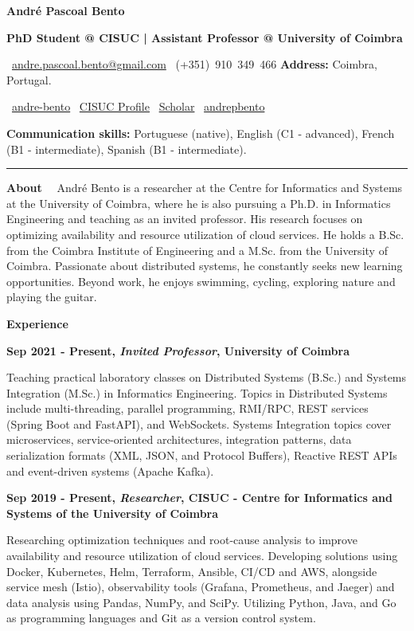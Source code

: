 \documentclass[a4paper,9pt]{memoir}
\newcommand{\cvheading}[1]{{\huge\bfseries\color{RoyalBlue} #1}} %
\newcommand{\cvsubheading}[1]{{\large\bfseries #1} \bigbreak} %
\newcommand{\Sep}{\vspace{1em}} %
\newcommand{\SmallSep}{\vspace{0.5em}} %
\newcommand{\aboutme}[2]{ %
    \textbf{\color{RoyalBlue} #1}~~#2\par\Sep
}
\newcommand{\CVSection}[1]{ %
    {\Large\textbf{#1}}\par
    \SmallSep %
}
\newcommand{\CVItem}[2]{ %
    \textbf{\color{RoyalBlue} #1}\par
    #2
    \SmallSep %
}
\begin{document}
\begin{center}
    \cvheading{\textbf{André Pascoal Bento}}

    \cvsubheading{\Large PhD Student @ CISUC | Assistant Professor @ University of Coimbra}
    
    \faEnvelope~\href{mailto:andre.pascoal.bento@gmail.com}{andre.pascoal.bento@gmail.com} \quad
    \faPhone~(+351)~910~349~466 \quad
    \textbf{Address:} Coimbra, Portugal.

    \faLinkedin~\href{https://www.linkedin.com/in/andre-bento/?locale=en_US}{andre-bento} \quad
    \faGlobe~\href{https://www.cisuc.uc.pt/en/people/apbento}{CISUC Profile} \quad
    \faGoogle~\href{https://scholar.google.com/citations?user=9Yl9gBwAAAAJ&hl=en}{Scholar} \quad
    \faGithub~\href{https://github.com/andrepbento}{andrepbento}

    \textbf{Communication skills:}
    Portuguese (native),
    English (C1 - advanced),
    French (B1 - intermediate),
    Spanish (B1 - intermediate).
    
    \noindent\rule{\linewidth}{0.4pt}
\end{center}


\aboutme{About}{%
André Bento is a researcher at the Centre for Informatics and Systems at the University of Coimbra, where he is also pursuing a Ph.D. in Informatics Engineering and teaching as an invited professor. His research focuses on optimizing availability and resource utilization of cloud services.
%
He holds a B.Sc. from the Coimbra Institute of Engineering and a M.Sc. from the University of Coimbra. Passionate about distributed systems, he constantly seeks new learning opportunities. Beyond work, he enjoys swimming, cycling, exploring nature and playing the guitar.
}

\CVSection{Experience}

\CVItem{Sep 2021 - Present, \textit{Invited Professor}, University of Coimbra}{
    Teaching practical laboratory classes on Distributed Systems (B.Sc.) and Systems Integration (M.Sc.) in Informatics Engineering. Topics in Distributed Systems include multi-threading, parallel programming, RMI/RPC, REST services (Spring Boot and FastAPI), and WebSockets. Systems Integration topics cover microservices, service-oriented architectures, integration patterns, data serialization formats (XML, JSON, and Protocol Buffers), Reactive REST APIs and event-driven systems (Apache Kafka).
}

\CVItem{Sep 2019 - Present, \textit{Researcher}, CISUC - Centre for Informatics and Systems of the University of Coimbra}{
    Researching optimization techniques and root-cause analysis to improve availability and resource utilization of cloud services.
    Developing solutions using Docker, Kubernetes, Helm, Terraform, Ansible, CI/CD and AWS, alongside service mesh (Istio), observability tools (Grafana, Prometheus, and Jaeger) and data analysis using Pandas, NumPy, and SciPy. Utilizing Python, Java, and Go as programming languages and Git as a version control system.
}
\end{document}
